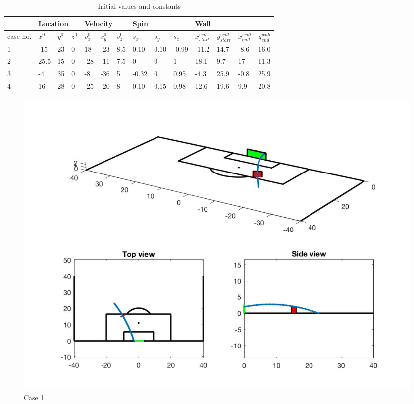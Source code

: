 \documentclass[12pt]{article}
\begin{document}
\begin{table}[htb]
\centering
\label{my-label}
\begin{tabular}{|l|l|l|l|l|l|l|l|l|l|l|l|l|l|}
\hline
         & \multicolumn{3}{l|}{Location} & \multicolumn{3}{l|}{Velocity}           & \multicolumn{3}{l|}{Spin}   & \multicolumn{4}{l|}{Wall}                                                     \\ \hline
case no. & $x^{0}$  & $y^{0}$  & $z^{0}$ & $v_{x}^{0}$ & $v_{y}^{0}$ & $v_{z}^{0}$ & $s_{x}$ & $s_{y}$ & $s_{z}$ & $x_{start}^{wall}$ & $y_{start}^{wall}$ & $x_{end}^{wall}$ & $y_{end}^{wall}$ \\ \hline
1        & -15      & 23       & 0       & 18          & -23         & 8.5         & 0.10    & 0.10    & -0.99   & -11.2              & 14.7               & -8.6             & 16.0             \\ \hline
2        & 25.5     & 15       & 0       & -28         & -11         & 7.5         & 0       & 0       & 1       & 18.1               & 9.7                & 17               & 11.3             \\ \hline
3        & -4       & 35       & 0       & -8          & -36         & 5           & -0.32   & 0       & 0.95    & -4.3               & 25.9               & -0.8             & 25.9             \\ \hline
4        & 16       & 28       & 0       & -25         & -20         & 8           & 0.10    & 0.15    & 0.98    & 12.6               & 19.6               & 9.9              & 20.8             \\ \hline
\end{tabular}
\caption{Initial values and constants}
\end{table}

\begin{figure}[htb]
\centering
\includegraphics[width=.75\textwidth]{case1.jpg}
\caption{Case 1}
\label{fig::MyFigure}
\end{figure}
\end{document}

